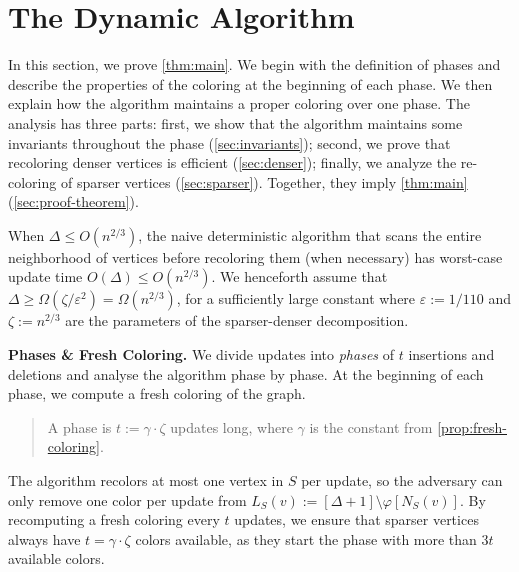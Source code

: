 \documentclass[a4paper,english,11pt]{amsart}
\renewcommand{\paragraph}[1]{\medskip\noindent\textbf{#1}}
\theoremstyle{definition}
\renewcommand{\leq}{\leqslant}
\renewcommand{\geq}{\geqslant}
\newcommand{\eps}{\varepsilon}
\newcommand{\col}{\varphi}
\newcommand{\NS}{N_{S}}
\newcommand{\LS}{L_{S}}
\begin{document}
 \section{The Dynamic Algorithm}
\label{sec:dynamic}

In this section, we prove \cref{thm:main}. We begin with the definition of phases and describe the properties of the coloring at the beginning of each phase. We then explain how the algorithm maintains a proper coloring over one phase. The analysis has three parts: first, we show that the algorithm maintains some invariants 
throughout the phase
(\cref{sec:invariants}); second, we prove that recoloring denser vertices is efficient (\cref{sec:denser}); finally, we analyze the re-coloring of sparser vertices (\cref{sec:sparser}). Together, they imply \cref{thm:main} (\cref{sec:proof-theorem}).

When $\Delta \leq O(n^{2/3})$, the naive deterministic algorithm that scans the entire neighborhood of vertices before recoloring them (when necessary) has worst-case update time $O(\Delta) \leq O(n^{2/3})$. We henceforth assume that $\Delta \geq \Omega( \zeta/\eps^2 ) = \Omega(n^{2/3})$, for a sufficiently large constant where $\eps := 1/110$ and $\zeta := n^{2/3}$ are the parameters of the sparser-denser decomposition.


\paragraph{Phases \& Fresh Coloring.}
We divide updates into \emph{phases} of $t$ insertions and deletions and analyse the algorithm phase by phase.
At the beginning of each phase, we compute a fresh coloring of the graph.
\begin{quote}
    A phase is $t := \gamma \cdot \zeta$ updates long, where $\gamma$ is the constant from \cref{prop:fresh-coloring}.
\end{quote}
The algorithm recolors at most one vertex in $S$ per update, so the adversary can only remove one color per update from $\LS(v) := [\Delta+1] \setminus \col[\NS(v)]$.
By recomputing a fresh coloring every $t$ updates, we ensure that sparser vertices always have $t = \gamma \cdot \zeta$ colors available,  as they start the phase with more than $3t$ available colors.
\end{document}
